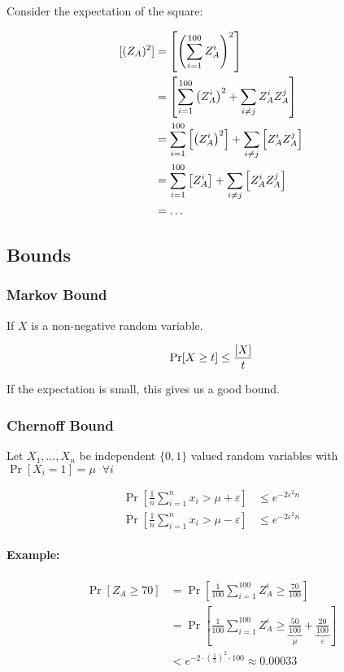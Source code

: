 \documentclass{idc_msc}
\let\E\relax
\DeclareMathOperator*{\E}{\mathrm{E}}
\begin{document}
Consider the expectation of the square:

\[
\begin{aligned}
\E[(Z_A)^2] &= \E\left[ \left( \sum_{i=1}^{100} Z_A^i \right)^2 \right] \\
&= \E\left[ \sum_{i=1}^{100} \left( Z_A^i \right)^2 + \sum_{i \ne j} Z_A^i Z_A^j \right] \\
&= \sum_{i=1}^{100} \E\left[ \left( Z_A^i \right)^2 \right] + \sum_{i \ne j} \E\left[  Z_A^i Z_A^j \right] \\
&= \sum_{i=1}^{100} \E\left[ Z_A^i \right] + \sum_{i \ne j} \E\left[  Z_A^i Z_A^j \right] \\
&= \ldots
\end{aligned}
\]

\subsection{Bounds}

\subsubsection{Markov Bound}

If \(X\) is a non-negative random variable.

\[\Pr[X \ge t] \le \frac{\E[X]}{t}\]

If the expectation is small, this gives us a good bound.

\subsubsection{Chernoff Bound}

Let \(X_1, \ldots, X_n\) be independent \(\{0,1\}\) valued random variables with \(\Pr[X_i = 1] = \mu \;\; \forall i\)

\[
\begin{aligned}
  \Pr \left[\frac{1}{n} \sum_{i=1}^{n} x_i > \mu + \varepsilon\right] &\le e^{-2\varepsilon^2 n} \\
  \Pr \left[\frac{1}{n} \sum_{i=1}^{n} x_i > \mu - \varepsilon\right] &\le e^{-2\varepsilon^2 n}
\end{aligned}
\]

\paragraph{Example:}

\[
\begin{aligned}
\Pr[Z_A \ge 70] &= \Pr\left[\frac{1}{100} \sum_{i=1}^{100} Z_A^i \ge \frac{70}{100}\right] \\
&= \Pr\left[\frac{1}{100} \sum_{i=1}^{100} Z_A^i \ge \underbrace{\frac{50}{100}}_{\mu} + \underbrace{\frac{20}{100}}_{\varepsilon}\right] \\
&< e^{-2\cdot\left(\frac{1}{5}\right)^2 \cdot 100} \approx 0.00033 \\
\end{aligned}
\]
\end{document}
